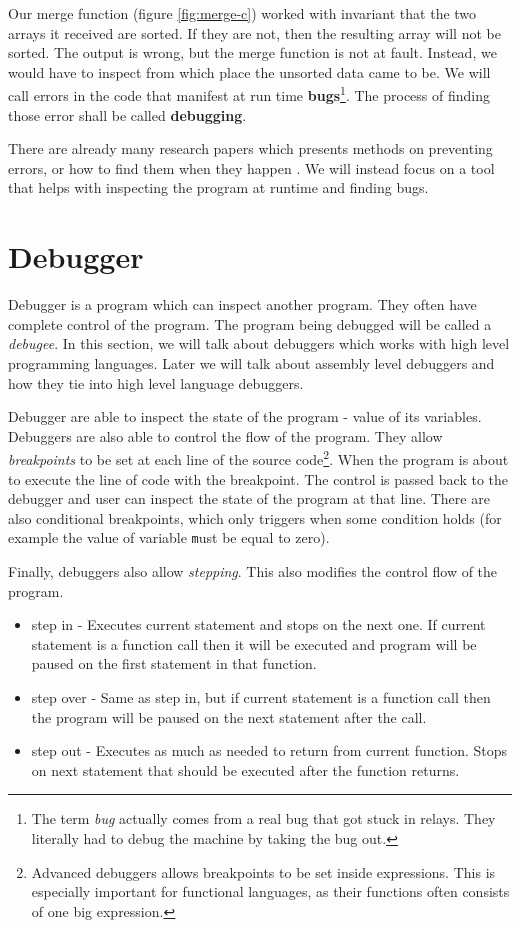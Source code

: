 Our merge function (figure \ref{fig:merge-c}) worked with invariant that the two arrays it received are sorted.
If they are not, then the resulting array will not be sorted. The output is wrong, but the merge function is not
at fault. Instead, we would have to inspect from which place the unsorted data came to be. We will call
errors in the code that manifest at run time \textbf{bugs}\footnote{The term \textit{bug} actually comes from a real bug that got stuck in relays.
They literally had to debug the machine by taking the bug out.}. The process of finding those error shall be
called \textbf{debugging}.

There are already many research papers which presents methods on preventing errors, or how to find them when they 
happen \cite{software-debugging-testing-verification, Debugging-difference-between-expert-and-novice, zeller2009programs, debugging-inputs}.
We will instead focus on a tool that helps with inspecting the program at runtime and finding bugs.

\section{Debugger}
Debugger is a program which can inspect another program. They often have complete control of the program.
The program being debugged will be called a \textit{debugee}. In this section, we will talk about debuggers
which works with high level programming languages. Later we will talk about assembly level debuggers and
how they tie into high level language debuggers.

Debugger are able to inspect the state of the program - value of its variables. Debuggers are also able to control
the flow of the program. They allow \textit{breakpoints} to be set at each line of the source code\footnote{Advanced debuggers allows breakpoints to be set inside expressions.
This is especially important for functional languages, as their functions often consists of one big expression.}.
When the program is about to execute the line of code with the breakpoint. The control is passed back to the
debugger and user can inspect the state of the program at that line. There are also conditional breakpoints,
which only triggers when some condition holds (for example the value of variable \texttt must be equal to zero).

Finally, debuggers also allow \textit{stepping}. This also modifies the control flow of the program.
\begin{itemize}
    \item step in - Executes current statement and stops on the next one. If current statement is a function call then
                    it will be executed and program will be paused on the first statement in that function.
    \item step over - Same as step in, but if current statement is a function call then the program will
                      be paused on the next statement after the call.
    \item step out -  Executes as much as needed to return from current function. Stops on next statement that
                      should be executed after the function returns.
\end{itemize}

